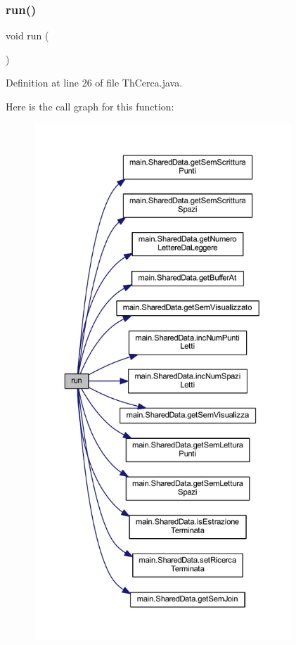 \subsubsection{\texorpdfstring{run()}{run()}}
{\footnotesize\ttfamily void run (\begin{DoxyParamCaption}{ }\end{DoxyParamCaption})}



Definition at line 26 of file Th\+Cerca.\+java.

Here is the call graph for this function\+:
\nopagebreak
\begin{figure}[H]
\begin{center}
\leavevmode
\includegraphics[height=550pt]{classmain_1_1_th_cerca_a13a43e6d814de94978c515cb084873b1_cgraph}
\end{center}
\end{figure}


